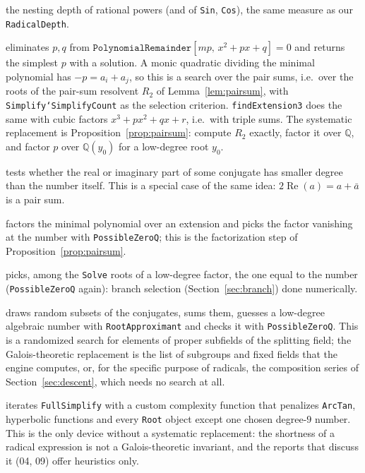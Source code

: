 \documentclass[11pt,a4paper]{article}
\theoremstyle{definition}
\theoremstyle{remark}
\newcommand{\Q}{\mathbb{Q}}
\newcommand{\code}[1]{\texttt{#1}}
\newcommand{\Root}{\code{Root}}
\begin{document}
\begin{description}[nosep]
\item[\code{radicalDepth}] the nesting depth of rational powers (and of \code{Sin},
\code{Cos}), the same measure as our \code{RadicalDepth}.
\item[\code{findExtension}] eliminates $p,q$ from
$\code{PolynomialRemainder}[mp,\,x^2+px+q]=0$ and returns the simplest $p$ with a
solution.  A monic quadratic dividing the minimal polynomial has $-p=a_i+a_j$, so
this is a search over the pair sums, i.e.\ over the roots of the pair-sum resolvent
$R_2$ of Lemma~\ref{lem:pairsum}, with \code{Simplify`SimplifyCount} as the
selection criterion.  \code{findExtension3} does the same with cubic factors
$x^3+px^2+qx+r$, i.e.\ with triple sums.  The systematic replacement is
Proposition~\ref{prop:pairsum}: compute $R_2$ exactly, factor it over $\Q$, and factor
$p$ over $\Q(y_0)$ for a low-degree root $y_0$.
\item[\code{project}] tests whether the real or imaginary part of some conjugate has
smaller degree than the number itself.  This is a special case of the same idea:
$2\operatorname{Re}(a)=a+\bar a$ is a pair sum.
\item[\code{factor}] factors the minimal polynomial over an extension and picks the
factor vanishing at the number with \code{PossibleZeroQ}; this is the factorization
step of Proposition~\ref{prop:pairsum}.
\item[\code{solve}] picks, among the \code{Solve} roots of a low-degree factor, the
one equal to the number (\code{PossibleZeroQ} again): branch selection
(Section~\ref{sec:branch}) done numerically.
\item[\code{fuzz}] draws random subsets of the conjugates, sums them, guesses a
low-degree algebraic number with \code{RootApproximant} and checks it with
\code{PossibleZeroQ}.  This is a randomized search for elements of proper subfields of
the splitting field; the Galois-theoretic replacement is the list of subgroups and
fixed fields that the engine computes, or, for the specific purpose of radicals, the
composition series of Section~\ref{sec:descent}, which needs no search at all.
\item[\code{simplify}] iterates \code{FullSimplify} with a custom complexity function
that penalizes \code{ArcTan}, hyperbolic functions and every \Root{} object except
one chosen degree-$9$ number.  This is the only device without a systematic
replacement: the shortness of a radical expression is not a Galois-theoretic
invariant, and the reports that discuss it (04, 09) offer heuristics only.
\end{description}
\end{document}
